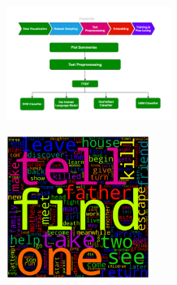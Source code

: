 \documentclass[hbrs-poster.tex]{subfiles}
\begin{document}
    {
        \begin{tikzfigure}
            \includegraphics[width=0.4\textwidth, height=0.245\textheight]{figures/Unbenanntes Diagramm.png}
        \end{tikzfigure}

        \begin{tikzfigure}
            \includegraphics[width=0.35\textwidth, height=0.165\textheight]{figures/wordcloud.png}
        \end{tikzfigure}
    }
\end{document}
